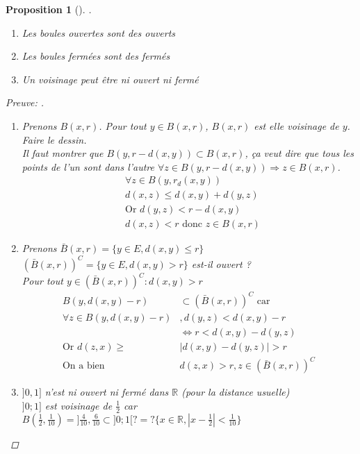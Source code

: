 \documentclass{article}
\theoremstyle{plain}%
\newtheorem{prop}[thm]{Proposition}
\theoremstyle{definition}
\theoremstyle{remark}
\begin{document}
\begin{prop}[]
    .
    \begin{enumerate}
        \item Les boules ouvertes sont des ouverts
        \item Les boules fermées sont des fermés
        \item Un voisinage peut être ni ouvert ni fermé
    \end{enumerate}
    \begin{proof}[Preuve: ]
        \begin{enumerate}
            \item Prenons $ B(x,r) $. Pour tout $ y \in B(x,r) $, $ B(x,r) $ est elle voisinage de $ y $. Faire le dessin. \\
            Il faut montrer que $ B(y, r-d(x,y)) \subset B(x,r) $, ça veut dire que tous les points de l'un sont dans l'autre $ \forall z \in B(y, r-d(x,y)) \Rightarrow z \in B(x,r) $. \begin{align*}
                & \forall z \in B(y, r_d(x,y)) \\
                & d(x,z) \leq d(x,y) + d(y,z) \\
                & \text{Or } d(y,z) < r-d(x,y) \\
                & d(x,z) < r \text{ donc } z \in B(x,r)
            \end{align*}
            \item Prenons $ \bar{B}(x,r) = \{y \in E, d(x,y) \leq r\} $
            $(\bar{B}(x,r))^C = \{y \in E, d(x,y) > r\}$ est-il ouvert ? \\
            Pour tout $ y \in (\bar{B}(x,r))^C : d(x,y) > r $ 
            \begin{align*}
                B(y, d(x,y)-r) &\subset (\bar{B}(x,r))^C \text{ car } \\
                \forall z \in B(y, d(x,y) -r ) &, d(y,z) < d(x,y) - r \\
                &\Leftrightarrow r < d(x,y) - d(y,z) \\
                \text{Or } d(z,x) \geq & \left| d(x,y) - d(y,z) \right| > r \\
                \text{On a bien } & d(z,x) > r, z \in (\bar{B}(x,r))^C
            \end{align*}
            \item $ ]0,1] $ n'est ni ouvert ni fermé dans $ \mathbb{R} $ (pour la distance usuelle) \\
            $ ]0;1] $ est voisinage de $ \frac{1}{2} $ car $ B(\frac{1}{2}, \frac{1}{10}) = ]\frac{4}{10}, \frac{6}{10} \subset ]0;1[ ?=? \{x \in \mathbb{R}, \left| x - \frac{1}{2} \right| < \frac{1}{10}\}$ 

\end{enumerate}
\end{proof}
\end{prop}
\end{document}
